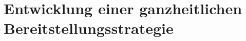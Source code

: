 
\section{Entwicklung einer ganzheitlichen Bereitstellungsstrategie}
\label{sec:Handlungsempfehlung}
